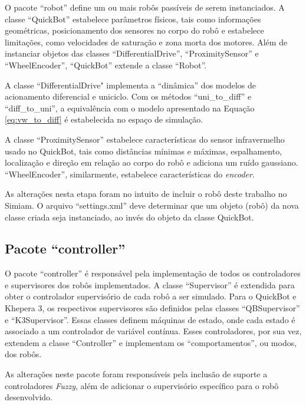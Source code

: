	O pacote ``robot'' define um ou mais robôs passíveis de serem instanciados. A
	classe ``QuickBot'' estabelece parâmetros físicos, tais como informações
	geométricas, posicionamento dos sensores no corpo do robô e estabelece
	limitações, como velocidades de saturação e zona morta dos motores. Além de
	instanciar objetos das classes ``DifferentialDrive'', ``ProximitySensor'' e
	``WheelEncoder'', ``QuickBot'' extende a classe ``Robot''. 
	
	A classe ``DifferentialDrive" implementa a ``dinâmica'' dos modelos de
	acionamento diferencial e uniciclo. Com os métodos ``uni\_to\_diff'' e ``diff\_to\_uni'', a
	equivalência com o modelo apresentado na Equação \ref{eq:vw_to_diff} é
	estabelecida no espaço de simulação. 

	A classe ``ProximitySensor'' estabelece características do sensor infravermelho
	usado no QuickBot, tais como distâncias mínimas e máximas, espalhamento, localização e
	direção em relação ao corpo do robô e adiciona um ruído gaussiano.
	``WheelEncoder'', similarmente, estabelece características do \textit{encoder}.
	
	As alterações nesta etapa foram no intuito de incluir o robô deste trabalho
	no Simiam. O arquivo ``settings.xml'' deve determinar que um objeto (robô) da
	nova classe criada seja instanciado, ao invés do objeto da classe QuickBot.
	
	\subsection{Pacote ``controller''}
	
	O pacote ``controller'' é responsável pela implementação de todos os
	controladores e supervisores dos robôs implementados. A classe ``Supervisor'' é
	extendida para obter o controlador supervisório de cada robô a ser simulado.
	Para o QuickBot e Khepera 3, os respectivos supervisores são definidos pelas
	classes ``QBSupervisor'' e ``K3Supervisor''. Essas classes definem máquinas de
	estado, onde cada estado é associado a um controlador de variável contínua.
	Esses controladores, por sua vez, extendem a classe ``Controller'' e
	implementam os ``comportamentos'', ou modos, dos robôs.
	
	As alterações neste pacote foram responsáveis pela inclusão de suporte a
	controladores \textit{Fuzzy}, além de adicionar o supervisório específico para
	o robô desenvolvido.
	
